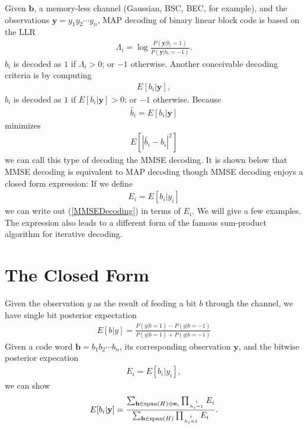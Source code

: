 \documentclass[conference]{IEEEtran}
\newcommand{\vect}[1]{\mathbf{#1}}
\begin{document}
Given $\vect{b}$, a memory-less channel (Gaussian, BSC, BEC, for example), and the observations $\vect{y}=y_1y_2\cdots y_n$, MAP decoding of binary linear block code is based on the LLR
\begin{align}
\Lambda_i = \log \frac{P(\vect{y}|b_i=1)}{P(\vect{y}|b_i=-1)}.
\end{align}
$b_i$ is decoded as $1$ if $\Lambda_i>0$; or $-1$ otherwise. Another conceivable decoding criteria is by computing
\begin{align}
E[b_i|\vect{y}],  \label{MMSEDecoding}
\end{align}
$b_i$ is decoded as $1$ if $E[b_i|\vect{y}]>0$; or $-1$ otherwise. Because
\begin{align}
\hat{b}_i = E[b_i|\vect{y}]
\end{align}
minimizes
\begin{align*}
E[|\hat{b}_i-b_i|^2]
\end{align*}
we can call this type of decoding the MMSE decoding. It is shown below that MMSE decoding is equivalent to MAP decoding though MMSE decoding enjoys a closed form expression: If we define
\begin{align}
E_i = E[b_i|y_i]
\end{align}
we can write out (\ref{MMSEDecoding}) in terms of $E_i$. We will give a few examples. The expression also leads to a different form of the famous sum-product algorithm for iterative decoding.

\section{The Closed Form}
Given the observation $y$ as the result of feeding a bit $b$ through the channel, we have single bit posterior expectation
\begin{align}
E[b|y] = \frac{P(y|b=1)-P(y|b=-1)}{P(y|b=1)+P(y|b=-1)} \label{e:single_observation_mmse}
\end{align}
Given a code word $\vect{b} = b_1b_2\cdots b_n$, its corresponding observation $\vect{y}$, and the bitwise posterior expecation
\begin{align}
E_i = E[b_i|y_i],
\end{align}
we can show
\begin{align}
E[b_i|\vect{y}] = \frac{\sum_{\vect{h}\in \mathrm{span} (H)\oplus \vect{e}_i}\prod_{i\atop h_i=1}E_i}{\sum_{\vect{h}\in \mathrm{span} (H)}\prod_{i\atop h_i=1}E_i}. \label{e:closedform}
\end{align}
\end{document}
